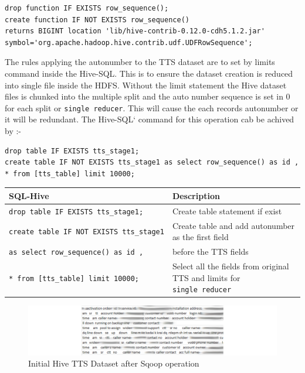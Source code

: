 \documentclass[]{article}
\begin{document}
\begin{verbatim}
drop function IF EXISTS row_sequence(); 
create function IF NOT EXISTS row_sequence() 
returns BIGINT location 'lib/hive-contrib-0.12.0-cdh5.1.2.jar'
symbol='org.apache.hadoop.hive.contrib.udf.UDFRowSequence';
\end{verbatim}

The rules applying the autonumber to the TTS dataset are to set by
limits command inside the Hive-SQL. This is to ensure the dataset
creation is reduced into single file inside the HDFS. Without the limit
statement the Hive dataset files is chunked into the multiple split and
the auto number sequence is set in 0 for each split or
\texttt{single\ reducer}. This will cause the each records autonumber or
it will be redundant. The Hive-SQL` command for this operation cab be
achived by :-

\begin{verbatim}
drop table IF EXISTS tts_stage1; 
create table IF NOT EXISTS tts_stage1 as select row_sequence() as id , 
* from [tts_table] limit 10000;
\end{verbatim}

\begin{longtable}[c]{@{}ll@{}}
\toprule
SQL-Hive & Description\tabularnewline
\midrule
\endhead
\texttt{drop\ table\ IF\ EXISTS\ tts\_stage1;} & Create table statement
if exist\tabularnewline
\texttt{create\ table\ IF\ NOT\ EXISTS\ tts\_stage1} & Create table and
add autonumber as the first field\tabularnewline
\texttt{as\ select\ row\_sequence()\ as\ id\ ,} & before the TTS
fields\tabularnewline
\texttt{*\ from\ {[}tts\_table{]}\ limit\ 10000;} & Select all the
fields from original TTS and limits for
\texttt{single\ reducer}\tabularnewline
\bottomrule
\end{longtable}

\begin{figure}[htbp]
\centering
\includegraphics{Journal1_files/figure-latex/unnamed-chunk-10-1.pdf}
\caption{Initial Hive TTS Dataset after Sqoop operation}
\end{figure}
\end{document}
